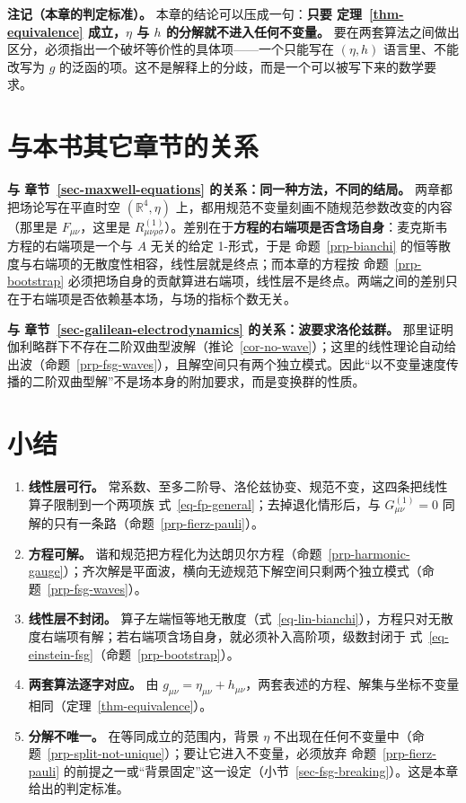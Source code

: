 \documentclass[
  chinese,
  a4paper,
  UTF8,
  12pt,
  oneside,
  openany]{ctexbook}
\providecommand{\tightlist}{%
  \setlength{\itemsep}{0pt}\setlength{\parskip}{0pt}}
\theoremstyle{plain}
\theoremstyle{plain}
\theoremstyle{plain}
\theoremstyle{definition}
\theoremstyle{plain}
\theoremstyle{plain}
\theoremstyle{remark}
\begin{document}
\textbf{注记（本章的判定标准）。} 本章的结论可以压成一句：\textbf{只要
定理~\ref{thm-equivalence} 成立，\(\eta\) 与 \(h\)
的分解就不进入任何不变量。}
要在两套算法之间做出区分，必须指出一个破坏等价性的具体项------一个只能写在
\((\eta,h)\) 语言里、不能改写为 \(g\)
的泛函的项。这不是解释上的分歧，而是一个可以被写下来的数学要求。

\section{与本书其它章节的关系}\label{sec-fsg-relations}

\textbf{与 章节~\ref{sec-maxwell-equations}
的关系：同一种方法，不同的结局。} 两章都把场论写在平直时空
\((\mathbb{R}^{4},\eta)\)
上，都用规范不变量刻画不随规范参数改变的内容（那里是
\(F_{\mu\nu}\)，这里是
\(R^{(1)}_{\mu\nu\rho\sigma}\)）。差别在于\textbf{方程的右端项是否含场自身}：麦克斯韦方程的右端项是一个与
\(A\) 无关的给定 1-形式，于是 命题~\ref{prp-bianchi}
的恒等散度与右端项的无散度性相容，线性层就是终点；而本章的方程按
命题~\ref{prp-bootstrap}
必须把场自身的贡献算进右端项，线性层不是终点。两端之间的差别只在于右端项是否依赖基本场，与场的指标个数无关。

\textbf{与 章节~\ref{sec-galilean-electrodynamics}
的关系：波要求洛伦兹群。}
那里证明伽利略群下不存在二阶双曲型波解（推论~\ref{cor-no-wave}）；这里的线性理论自动给出波（命题~\ref{prp-fsg-waves}），且解空间只有两个独立模式。因此``以不变量速度传播的二阶双曲型解''不是场本身的附加要求，而是变换群的性质。

\section{小结}\label{sec-fsg-summary}

\begin{enumerate}
\def\labelenumi{\arabic{enumi}.}
\tightlist
\item
  \textbf{线性层可行。}
  常系数、至多二阶导、洛伦兹协变、规范不变，这四条把线性算子限制到一个两项族
  式~\ref{eq-fp-general}；去掉退化情形后，与 \(G^{(1)}_{\mu\nu}=0\)
  同解的只有一条路（命题~\ref{prp-fierz-pauli}）。
\item
  \textbf{方程可解。}
  谐和规范把方程化为达朗贝尔方程（命题~\ref{prp-harmonic-gauge}）；齐次解是平面波，横向无迹规范下解空间只剩两个独立模式（命题~\ref{prp-fsg-waves}）。
\item
  \textbf{线性层不封闭。}
  算子左端恒等地无散度（式~\ref{eq-lin-bianchi}），方程只对无散度右端项有解；若右端项含场自身，就必须补入高阶项，级数封闭于
  式~\ref{eq-einstein-fsg}（命题~\ref{prp-bootstrap}）。
\item
  \textbf{两套算法逐字对应。} 由
  \(g_{\mu\nu}=\eta_{\mu\nu}+h_{\mu\nu}\)，两套表述的方程、解集与坐标不变量相同（定理~\ref{thm-equivalence}）。
\item
  \textbf{分解不唯一。} 在等同成立的范围内，背景 \(\eta\)
  不出现在任何不变量中（命题~\ref{prp-split-not-unique}）；要让它进入不变量，必须放弃
  命题~\ref{prp-fierz-pauli}
  的前提之一或``背景固定''这一设定（小节~\ref{sec-fsg-breaking}）。这是本章给出的判定标准。
\end{enumerate}
\end{document}
